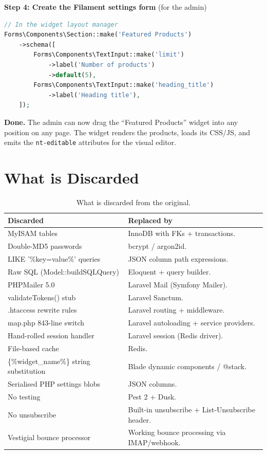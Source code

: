 \documentclass[11pt,a4paper]{article}
\begin{document}
\begin{guidebox}
\textbf{Step 4: Create the Filament settings form} (for the admin)
\begin{lstlisting}[language=PHP]
// In the widget layout manager
Forms\Components\Section::make('Featured Products')
    ->schema([
        Forms\Components\TextInput::make('limit')
            ->label('Number of products')
            ->default(5),
        Forms\Components\TextInput::make('heading_title')
            ->label('Heading title'),
    ]);
\end{lstlisting}

\textbf{Done.} The admin can now drag the ``Featured Products''
widget into any position on any page. The widget renders the
products, loads its CSS/JS, and emits the \texttt{nt-editable}
attributes for the visual editor.
\end{guidebox}

\section{What is Discarded}\label{sec:discarded}

\begin{table}[htbp]
\centering
\caption{What is discarded from the original.}\label{tab:discarded}
\footnotesize\sloppy
\begin{tabularx}{\columnwidth}{>{\raggedright\arraybackslash}p{4.5cm}X}
\toprule
\textbf{Discarded} & \textbf{Replaced by} \\
\midrule
MyISAM tables & InnoDB with FKs + transactions. \\
Double-MD5 passwords & bcrypt / argon2id. \\
LIKE '\%key=value\%' queries & JSON column path expressions. \\
Raw SQL (Model::buildSQLQuery) & Eloquent + query builder. \\
PHPMailer 5.0 & Laravel Mail (Symfony Mailer). \\
validateTokens() stub & Laravel Sanctum. \\
.htaccess rewrite rules & Laravel routing + middleware. \\
map.php 843-line switch & Laravel autoloading + service providers. \\
Hand-rolled session handler & Laravel session (Redis driver). \\
File-based cache & Redis. \\
\{\%widget\_name\%\} string substitution & Blade dynamic components / @stack. \\
Serialised PHP settings blobs & JSON columns. \\
No testing & Pest 2 + Dusk. \\
No unsubscribe & Built-in unsubscribe + List-Unsubscribe header. \\
Vestigial bounce processor & Working bounce processing via IMAP/webhook. \\
\bottomrule
\end{tabularx}
\end{table}
\end{document}
